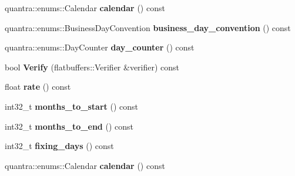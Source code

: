 \begin{DoxyCompactItemize}
\item 
\mbox{\label{structquantra_1_1FLATBUFFERS__FINAL__CLASS_a22bef2961bc16a42406e7b6c3d62a33e}} 
quantra\+::enums\+::\+Calendar {\bfseries calendar} () const
\item 
\mbox{\label{structquantra_1_1FLATBUFFERS__FINAL__CLASS_acc1afb278b3cf7c9923940b4704456f9}} 
quantra\+::enums\+::\+Business\+Day\+Convention {\bfseries business\+\_\+day\+\_\+convention} () const
\item 
\mbox{\label{structquantra_1_1FLATBUFFERS__FINAL__CLASS_a955b9a33f908db3b82dea98242bc214e}} 
quantra\+::enums\+::\+Day\+Counter {\bfseries day\+\_\+counter} () const
\item 
\mbox{\label{structquantra_1_1FLATBUFFERS__FINAL__CLASS_aed693ee5a45b5f53af7411f9cab6793a}} 
bool {\bfseries Verify} (flatbuffers\+::\+Verifier \&verifier) const
\item 
\mbox{\label{structquantra_1_1FLATBUFFERS__FINAL__CLASS_aa5a25f3bfb8a4b4822cb5fcb1b479ff8}} 
float {\bfseries rate} () const
\item 
\mbox{\label{structquantra_1_1FLATBUFFERS__FINAL__CLASS_a80fe5cc4c8f09aaae93acf06dfaf07ab}} 
int32\+\_\+t {\bfseries months\+\_\+to\+\_\+start} () const
\item 
\mbox{\label{structquantra_1_1FLATBUFFERS__FINAL__CLASS_abd8d071266371cb70216d1a6abb3c42d}} 
int32\+\_\+t {\bfseries months\+\_\+to\+\_\+end} () const
\item 
\mbox{\label{structquantra_1_1FLATBUFFERS__FINAL__CLASS_af545a8a6ad48fc2a0597341e9ae68026}} 
int32\+\_\+t {\bfseries fixing\+\_\+days} () const
\item 
\mbox{\label{structquantra_1_1FLATBUFFERS__FINAL__CLASS_a22bef2961bc16a42406e7b6c3d62a33e}} 
quantra\+::enums\+::\+Calendar {\bfseries calendar} () const

\end{DoxyCompactItemize}
